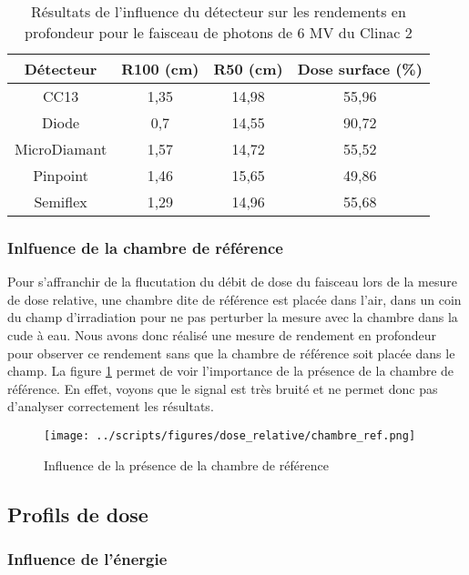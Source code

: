 \documentclass{article}
\begin{document}
\begin{table}[h]
  \centering
  \begin{tabular}{cccc}
    \toprule
    \textbf{Détecteur} & \textbf{R100 (cm)} & \textbf{R50 (cm)} & \textbf{Dose surface (\%)} \\
    \toprule
    CC13 & 1,35 & 14,98 & 55,96 \\
    Diode & 0,7 & 14,55 & 90,72 \\
    MicroDiamant & 1,57 & 14,72 & 55,52 \\
    Pinpoint & 1,46 & 15,65 & 49,86 \\
    Semiflex & 1,29 & 14,96 & 55,68 \\
    \bottomrule
  \end{tabular}
  \caption{Résultats de l'influence du détecteur sur les rendements en profondeur pour le faisceau de photons de 6 MV du Clinac 2}
  \label{table_rdt_detecteurs}
\end{table}

\subsubsection{Inlfuence de la chambre de référence}

Pour s'affranchir de la flucutation du débit de dose du faisceau lors de la mesure de dose relative, une chambre dite de référence est placée dans l'air, dans un coin du champ d'irradiation pour ne pas perturber la mesure avec la chambre dans la cude à eau. Nous avons donc réalisé une mesure de rendement en profondeur pour observer ce rendement sans que la chambre de référence soit placée dans le champ. La figure \ref*{fig_sanss_chambre_ref} permet de voir l'importance de la présence de la chambre de référence. En effet, voyons que le signal est très bruité et ne permet donc pas d'analyser correctement les résultats.

\begin{figure}[h]
  \centering
  \texttt{[image: ../scripts/figures/dose\_relative/chambre\_ref.png]}
  \caption{Influence de la présence de la chambre de référence}
  \label{fig_sanss_chambre_ref}
\end{figure}

\clearpage
\subsection{Profils de dose}
\subsubsection{Influence de l'énergie}
\end{document}
